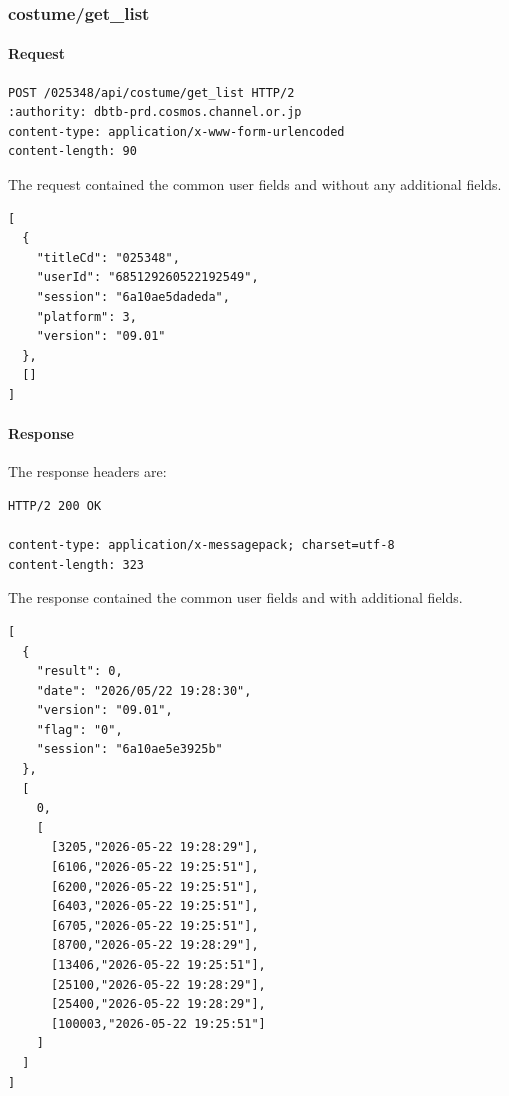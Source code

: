 \subsubsection{costume/get\_list}
\label{subsec:api_costume_get_list}

\paragraph{Request}

\begin{lstlisting}
POST /025348/api/costume/get_list HTTP/2
:authority: dbtb-prd.cosmos.channel.or.jp
content-type: application/x-www-form-urlencoded
content-length: 90
\end{lstlisting}

The request contained the common user fields and without any additional fields.

\begin{lstlisting}
[
  {
    "titleCd": "025348",
    "userId": "685129260522192549",
    "session": "6a10ae5dadeda",
    "platform": 3,
    "version": "09.01"
  },
  []
]
\end{lstlisting}

\newpage

\paragraph{Response}

The response headers are:

\begin{lstlisting}
HTTP/2 200 OK

content-type: application/x-messagepack; charset=utf-8
content-length: 323
\end{lstlisting}

The response contained the common user fields and with additional fields.

\begin{lstlisting}
[
  {
    "result": 0,
    "date": "2026/05/22 19:28:30",
    "version": "09.01",
    "flag": "0",
    "session": "6a10ae5e3925b"
  },
  [
    0,
    [
      [3205,"2026-05-22 19:28:29"],
      [6106,"2026-05-22 19:25:51"],
      [6200,"2026-05-22 19:25:51"],
      [6403,"2026-05-22 19:25:51"],
      [6705,"2026-05-22 19:25:51"],
      [8700,"2026-05-22 19:28:29"],
      [13406,"2026-05-22 19:25:51"],
      [25100,"2026-05-22 19:28:29"],
      [25400,"2026-05-22 19:28:29"],
      [100003,"2026-05-22 19:25:51"]
    ]
  ]
]
\end{lstlisting}


